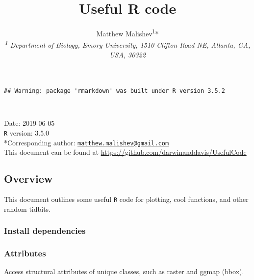 \documentclass[10,portrait]{article}
\title{Useful R code}
\author{Matthew
Malishev\textsuperscript{1}*\\[2\baselineskip]\emph{\textsuperscript{1}
Department of Biology, Emory University, 1510 Clifton Road NE, Atlanta,
GA, USA, 30322}}
\date{}
\newenvironment{Shaded}{\begin{snugshade}}{\end{snugshade}}
\newcommand{\KeywordTok}[1]{\textcolor[rgb]{0.13,0.29,0.53}{\textbf{#1}}}
\newcommand{\DataTypeTok}[1]{\textcolor[rgb]{0.13,0.29,0.53}{#1}}
\newcommand{\DecValTok}[1]{\textcolor[rgb]{0.00,0.00,0.81}{#1}}
\newcommand{\StringTok}[1]{\textcolor[rgb]{0.31,0.60,0.02}{#1}}
\newcommand{\CommentTok}[1]{\textcolor[rgb]{0.56,0.35,0.01}{\textit{#1}}}
\newcommand{\OperatorTok}[1]{\textcolor[rgb]{0.81,0.36,0.00}{\textbf{#1}}}
\newcommand{\NormalTok}[1]{#1}
\begin{document}
\maketitle

{
\hypersetup{linkcolor=black}
\setcounter{tocdepth}{4}
\tableofcontents
}
\begin{verbatim}
## Warning: package 'rmarkdown' was built under R version 3.5.2
\end{verbatim}

~

Date: 2019-06-05\\
\texttt{R} version: 3.5.0\\
*Corresponding author:
\href{mailto:matthew.malishev@gmail.com}{\nolinkurl{matthew.malishev@gmail.com}}\\
This document can be found at
\url{https://github.com/darwinanddavis/UsefulCode}

\newpage  

\subsection{Overview}\label{overview}

This document outlines some useful \texttt{R} code for plotting, cool
functions, and other random tidbits.

\subsubsection{Install dependencies}\label{install-dependencies}

\subsubsection{Attributes}\label{attributes}

Access structural attributes of unique classes, such as raster and ggmap
(bbox).

\begin{Shaded}
\end{Shaded}
\end{document}
